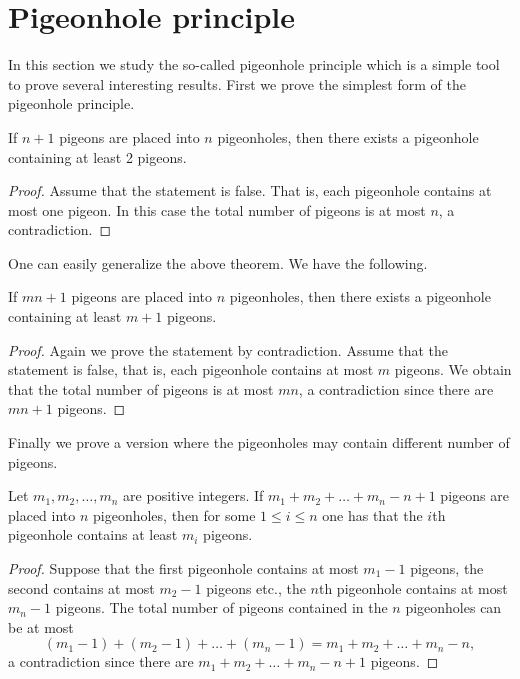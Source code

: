 \section{Pigeonhole principle}
In this section we study the so-called pigeonhole principle which is a simple tool to prove several interesting results.
First we prove the simplest form of the pigeonhole principle.
\begin{theorem}
If $n+1$ pigeons are placed into $n$ pigeonholes, then there exists a pigeonhole containing at least 2 pigeons.
\end{theorem}
\begin{proof}
Assume that the statement is false. That is, each pigeonhole contains at most one pigeon. In this case the total number of 
pigeons is at most $n$, a contradiction.
\end{proof}
One can easily generalize the above theorem. We have the following.
\begin{theorem}
If $mn+1$ pigeons are placed into $n$ pigeonholes, then there exists a pigeonhole containing at least $m+1$ pigeons.
\end{theorem}
\begin{proof}
Again we prove the statement by contradiction. Assume that the statement is false, that is, each pigeonhole contains at most $m$ pigeons.
We obtain that the total number of pigeons is at most $mn$, a contradiction since there are $mn+1$ pigeons.
\end{proof}
Finally we prove a version where the pigeonholes may contain different number of pigeons.
\begin{theorem}\label{pigeon-III}
Let $m_1,m_2,\ldots,m_n$ are positive integers. If $m_1+m_2+\ldots+m_n-n+1$ pigeons are placed into $n$ pigeonholes, then for some
$1\leq i\leq n$ one has that the $i$th pigeonhole contains at least $m_i$ pigeons.
\end{theorem}
\begin{proof}
Suppose that the first pigeonhole contains at most $m_1-1$ pigeons, the second contains at most $m_2-1$ pigeons etc., the 
$n$th pigeonhole contains at most $m_n-1$ pigeons. The total number of pigeons contained in the $n$ pigeonholes can be at most
$$
(m_1-1)+(m_2-1)+\ldots+(m_n-1)=m_1+m_2+\ldots+m_n-n,
$$
a contradiction since there are $m_1+m_2+\ldots+m_n-n+1$ pigeons.
\end{proof}

